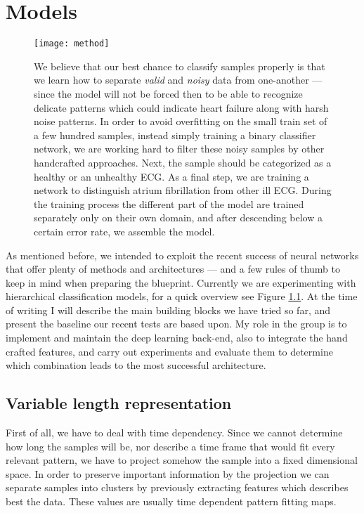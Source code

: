 \chapter{Models}
\begin{figure}[h]
  \centering
  \texttt{[image: method]}
  \caption{We believe that our best chance to classify samples properly is that we learn how to separate \textit{valid} and \textit{noisy} data from one-another --- since the model will not be forced then to be able to recognize delicate patterns which could indicate heart failure along with harsh noise patterns. In order to avoid overfitting on the small train set of a few hundred samples, instead simply training a binary classifier network, we are working hard to filter these noisy samples by other handcrafted approaches. Next, the sample should be categorized as a healthy or an unhealthy ECG. As a final step, we are training a network to distinguish atrium fibrillation from other ill ECG. During the training process the different part of the model are trained separately only on their own domain, and after descending below a certain error rate, we assemble the model.}
  \label{fig:method}
\end{figure}

As mentioned before, we intended to exploit the recent success of neural networks that offer plenty of methods and architectures --- and a few rules of thumb to keep in mind when preparing the blueprint.
Currently we are experimenting with hierarchical classification models, for a quick overview see Figure \ref{fig:method}.
At the time of writing I will describe the main building blocks we have tried so far, and present the baseline our recent tests are based upon.
My role in the group is to implement and maintain the deep learning back-end, also to integrate the hand crafted features, and carry out experiments and evaluate them to determine which combination leads to the most successful architecture.

\section{Variable length representation}
First of all, we have to deal with time dependency. Since we cannot determine how long the samples will be, nor describe a time frame that would fit every relevant pattern, we have to project somehow the sample into a fixed dimensional space. In order to preserve important information by the projection we can separate samples into clusters by previously extracting features which describes best the data. These values are usually time dependent pattern fitting maps.

